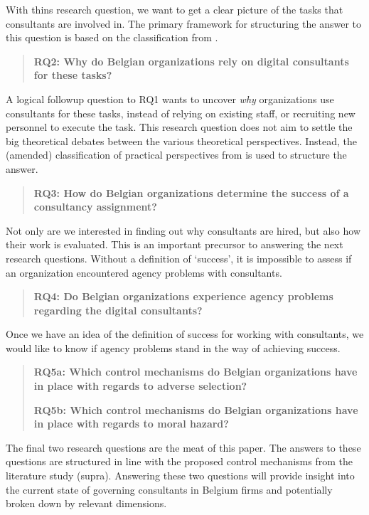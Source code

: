 \documentclass[12pt]{article}
\begin{document}
With thins research question, we want to get a clear picture of the
tasks that consultants are involved in. The primary framework for
structuring the answer to this question is based on the classification
from \citet{turner1982}.

\begin{quote}
\textbf{RQ2: Why do Belgian organizations rely on digital consultants
for these tasks?}
\end{quote}

A logical followup question to RQ1 wants to uncover \emph{why}
organizations use consultants for these tasks, instead of relying on
existing staff, or recruiting new personnel to execute the task. This
research question does not aim to settle the big theoretical debates
between the various theoretical perspectives. Instead, the (amended)
classification of practical perspectives from \citet{lacity1994} is used
to structure the answer.

\begin{quote}
\textbf{RQ3: How do Belgian organizations determine the success of a
consultancy assignment?}
\end{quote}

Not only are we interested in finding out why consultants are hired, but
also how their work is evaluated. This is an important precursor to
answering the next research questions. Without a definition of
`success', it is impossible to assess if an organization encountered
agency problems with consultants.

\begin{quote}
\textbf{RQ4: Do Belgian organizations experience agency problems
regarding the digital consultants?}
\end{quote}

Once we have an idea of the definition of success for working with
consultants, we would like to know if agency problems stand in the way
of achieving success.

\begin{quote}
\textbf{RQ5a: Which control mechanisms do Belgian organizations have in
place with regards to adverse selection?}

\textbf{RQ5b: Which control mechanisms do Belgian organizations have in
place with regards to moral hazard?}
\end{quote}

The final two research questions are the meat of this paper. The answers
to these questions are structured in line with the proposed control
mechanisms from the literature study (supra). Answering these two
questions will provide insight into the current state of governing
consultants in Belgium firms and potentially broken down by relevant
dimensions.
\end{document}

